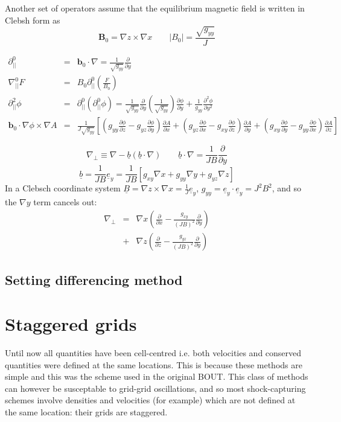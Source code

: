 \documentclass[12pt]{article}
\newcommand{\deriv}[2]{\ensuremath{\frac{\partial #1}{\partial #2}}}
\begin{document}
Another set of operators assume that the equilibrium magnetic field is written
in Clebsh form as 
\[
\mathbf{B}_0 = \nabla z\times\nabla x \qquad \left|B_0\right| = \frac{\sqrt{g_{yy}}}{J}
\]

\begin{eqnarray*}
\partial^0_{||} &=& \mathbf{b}_0\cdot\nabla = \frac{1}{\sqrt{g_{yy}}}\deriv{}{y} \\
\nabla^0_{||}F &=& B_0\partial^0_{||}\left(\frac{F}{B_0}\right) \\
\partial^2_{||}\phi &=& \partial^0_{||}\left(\partial^0_{||}\phi\right) = \frac{1}{\sqrt{g_{yy}}}\deriv{}{y}\left(\frac{1}{\sqrt{g_{yy}}}\right)\deriv{\phi}{y} + \frac{1}{g_{yy}}\frac{\partial^2\phi}{\partial y^2} \\
\mathbf{b}_0\cdot\nabla\phi\times\nabla A &=& \frac{1}{J\sqrt{g_{yy}}}\left[\left(g_{yy}\deriv{\phi}{z} - g_{yz}\deriv{\phi}{y}\right)\deriv{A}{x} + \left(g_{yz}\deriv{\phi}{x} - g_{xy}\deriv{\phi}{z}\right)\deriv{A}{y} + \left(g_{xy}\deriv{\phi}{y} - g_{yy}\deriv{\phi}{x}\right)\deriv{A}{z}\right]
\end{eqnarray*}

\[
\nabla_\perp \equiv \nabla - \underline{b}\left(\underline{b}\cdot\nabla\right) \qquad \underline{b}\cdot\nabla = \frac{1}{JB}\frac{\partial}{\partial y}
\]
\[
\underline{b} = \frac{1}{JB}\underline{e}_y = \frac{1}{JB}\left[g_{xy}\nabla x + g_{yy}\nabla y + g_{yz}\nabla z\right]
\]
In a Clebsch coordinate system $\underline{B} = \nabla z \times \nabla x = \frac{1}{J}\underline{e}_y$, $g_{yy} = \underline{e}_y\cdot\underline{e}_y = J^2B^2$, and so the $\nabla y$ term cancels out:
\begin{eqnarray*}
\nabla_\perp &=& \nabla x\left(\deriv{}{x} - \frac{g_{xy}}{\left(JB\right)^2}\deriv{}{y}\right) \\
&+& \nabla z\left(\deriv{}{z} - \frac{g_{yz}}{\left(JB\right)^2}\deriv{}{y}\right)
\end{eqnarray*}

\subsection{Setting differencing method}

\section{Staggered grids}
\label{sec:staggergrids}
Until now all quantities have been cell-centred i.e. both velocities
and conserved quantities were defined at the same locations. This
is because these methods are simple and this was the scheme used in 
the original BOUT. This class of methods can however be susceptable to
grid-grid oscillations, and so most shock-capturing schemes involve
densities and velocities (for example) which are not defined at the same location: their
grids are staggered.
\end{document}
